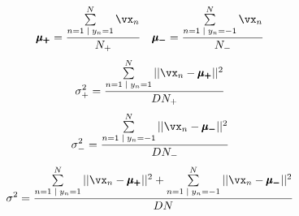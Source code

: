 \documentclass[a4paper,11pt]{article}
\begin{document}
\begin{mlsolution}
    \begin{equation*}
        \pmb{\mu_+} = \frac{\sum\limits_{n=1\;|\; y_n=1}^N \vx_n}{N_+} \quad \pmb{\mu_-} = \frac{\sum\limits_{n=1\;|\; y_n=-1}^N \vx_n}{N_-}
    \end{equation*}
    \begin{equation*}
        \sigma_+^2 = \frac{\sum\limits_{n=1\;|\; y_n=1}^N || \vx_n - \pmb{\mu_+} ||^2}{DN_+}
    \end{equation*}
    \begin{equation*}
        \sigma_-^2 = \frac{\sum\limits_{n=1\;|\; y_n=-1}^N || \vx_n - \pmb{\mu_-} ||^2}{DN_-}
    \end{equation*}
    \begin{equation*}
        \sigma^2 = \frac{\sum\limits_{n=1\;|\; y_n=1}^N || \vx_n - \pmb{\mu_+} ||^2 + \sum\limits_{n=1\;|\; y_n=-1}^N || \vx_n - \pmb{\mu_-} ||^2}{DN}
    \end{equation*}


\end{mlsolution}
\end{document}
